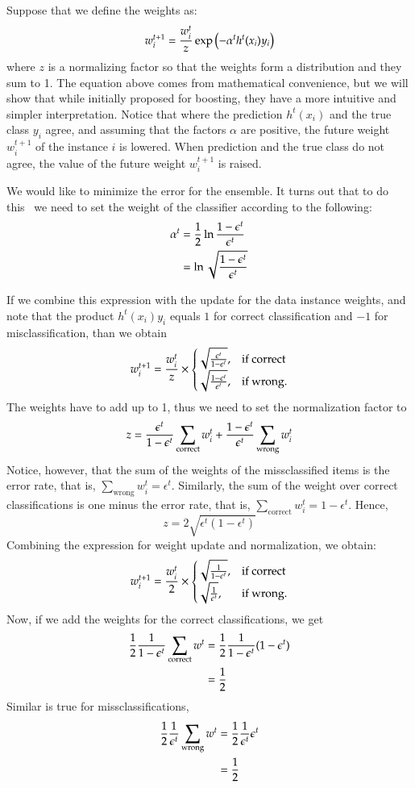 \begin{refsection}
Suppose that we define the weights as:
$$w_i^{t+1}={w_i^t\over z} \exp\left(-\alpha^t h^t(x_i)y_i\right)$$
where $z$ is a normalizing factor so that the weights form a distribution and they sum to 1. The equation above comes from mathematical convenience, but we will show that while initially proposed for boosting, they have a more intuitive and simpler interpretation. Notice that where the prediction $h^t(x_i)$ and the true class $y_i$ agree, and assuming that the factors $\alpha$ are positive, the future weight $w_i^{t+1}$ of the instance $i$ is lowered. When prediction and the true class do not agree, the value of the future weight $w_i^{t+1}$ is raised.

We would like to minimize the error for the ensemble. It turns out that to do this~\citep{FreundSchapire1997} we need to set the weight of the classifier according to the following:
\begin{align}
\alpha^t & ={1\over 2}\ln{1-\epsilon^t \over \epsilon^t} \label{eq-freundschapire}\\
& = \ln{\sqrt{1-\epsilon^t \over \epsilon^t}}
\end{align}

If we combine this expression with the update for the data instance weights, and note that the product $h^t(x_i)y_i$ equals $1$ for correct classification and $-1$ for misclassification, than we obtain
$$w_i^{t+1} = {w_i^t \over z} \times
\begin{cases}
\sqrt{\epsilon^t \over 1-\epsilon^t }, & \text{if correct} \\
\sqrt{1-\epsilon^t \over \epsilon^t}, & \text{if wrong}.
\end{cases}
$$
The weights have to add up to 1, thus we need to set the normalization factor to
$$
z = {\epsilon^t \over 1-\epsilon^t} \sum_\text{correct} w_i^t + {1-\epsilon^t \over \epsilon^t}\sum_\text{wrong} w_i^t
$$
Notice, however, that the sum of the weights of the missclassified items is the error rate, that is, $\sum_\text{wrong} w_i^t=\epsilon^t$. Similarly, the sum of the weight over correct classifications is one minus the error rate, that is, $\sum_\text{correct} w_i^t=1-\epsilon^t$. Hence,
$$
z = 2\sqrt{\epsilon^t (1-\epsilon^t)}
$$
Combining the expression for weight update and normalization, we obtain:
$$w_i^{t+1} = {w_i^t \over 2} \times
\begin{cases}
\sqrt{1\over 1-\epsilon^t }, & \text{if correct} \\
\sqrt{1\over \epsilon^t}, & \text{if wrong}.
\end{cases}
$$
Now, if we add the weights for the correct classifications, we get
\begin{align*}
{1\over 2}{1\over 1-\epsilon^t}\sum_\text{correct} w^t & = {1\over 2}{1\over 1-\epsilon^t} (1-\epsilon^t)\\
& = {1\over 2}
\end{align*}
Similar is true for missclassifications,
\begin{align*}
{1\over 2}{1\over \epsilon^t}\sum_\text{wrong} w^t & = {1\over 2}{1\over \epsilon^t} \epsilon^t\\
& = {1\over 2}
\end{align*}


\end{refsection}
